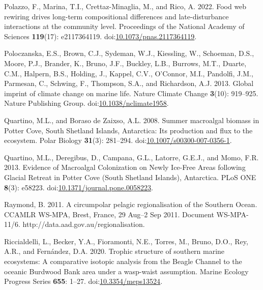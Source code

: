\documentclass[
]{article}
\newlength{\cslhangindent}
\newenvironment{CSLReferences}[2] %
 {\begin{list}{}{%
  \setlength{\itemindent}{0pt}
  \setlength{\leftmargin}{0pt}
  \setlength{\parsep}{0pt}
  \ifodd #1
   \setlength{\leftmargin}{\cslhangindent}
   \setlength{\itemindent}{-1\cslhangindent}
  \fi
  \setlength{\itemsep}{#2\baselineskip}}}
 {\end{list}}
\begin{document}
\begin{CSLReferences}{1}{0}
Polazzo, F., Marina, T.I., Crettaz-Minaglia, M., and Rico, A. 2022. Food
web rewiring drives long-term compositional differences and
late-disturbance interactions at the community level. Proceedings of the
National Academy of Sciences \textbf{119}(17): e2117364119.
doi:\href{https://doi.org/10.1073/pnas.2117364119}{10.1073/pnas.2117364119}.

Poloczanska, E.S., Brown, C.J., Sydeman, W.J., Kiessling, W., Schoeman,
D.S., Moore, P.J., Brander, K., Bruno, J.F., Buckley, L.B., Burrows,
M.T., Duarte, C.M., Halpern, B.S., Holding, J., Kappel, C.V., O'Connor,
M.I., Pandolfi, J.M., Parmesan, C., Schwing, F., Thompson, S.A., and
Richardson, A.J. 2013. Global imprint of climate change on marine life.
Nature Climate Change \textbf{3}(10): 919--925. Nature Publishing Group.
doi:\href{https://doi.org/10.1038/nclimate1958}{10.1038/nclimate1958}.

Quartino, M.L., and Boraso de Zaixso, A.L. 2008. Summer macroalgal
biomass in {Potter Cove}, {South Shetland Islands}, {Antarctica}: Its
production and flux to the ecosystem. Polar Biology \textbf{31}(3):
281--294.
doi:\href{https://doi.org/10.1007/s00300-007-0356-1}{10.1007/s00300-007-0356-1}.

Quartino, M.L., Deregibus, D., Campana, G.L., Latorre, G.E.J., and Momo,
F.R. 2013. Evidence of {Macroalgal Colonization} on {Newly Ice-Free
Areas} following {Glacial Retreat} in {Potter Cove} ({South Shetland
Islands}), {Antarctica}. PLoS ONE \textbf{8}(3): e58223.
doi:\href{https://doi.org/10.1371/journal.pone.0058223}{10.1371/journal.pone.0058223}.

Raymond, B. 2011. A circumpolar pelagic regionalisation of the {Southern
Ocean}. {CCAMLR WS-MPA}, {Brest}, {France}, 29 {Aug}--2 {Sep} 2011.
{Document WS-MPA-11}/6. {http://data.aad.gov.au/regionalisation}.

Riccialdelli, L., Becker, Y.A., Fioramonti, N.E., Torres, M., Bruno,
D.O., Rey, A.R., and Fernández, D.A. 2020. Trophic structure of southern
marine ecosystems: A comparative isotopic analysis from the {Beagle
Channel} to the oceanic {Burdwood Bank} area under a wasp-waist
assumption. Marine Ecology Progress Series \textbf{655}: 1--27.
doi:\href{https://doi.org/10.3354/meps13524}{10.3354/meps13524}.


\end{CSLReferences}
\end{document}
